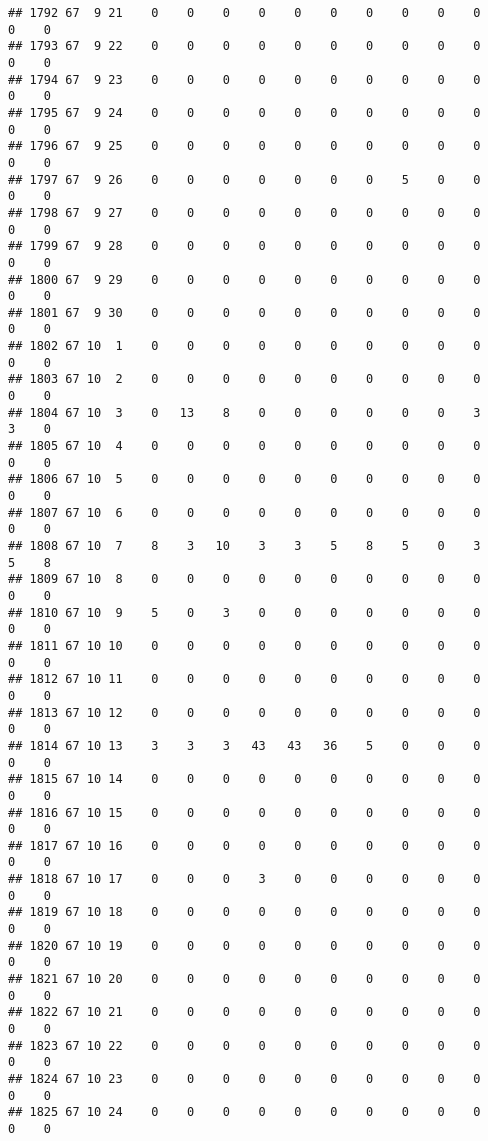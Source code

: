 \documentclass[]{article}
\begin{document}
\begin{verbatim}
## 1792 67  9 21    0    0    0    0    0    0    0    0    0    0    0    0
## 1793 67  9 22    0    0    0    0    0    0    0    0    0    0    0    0
## 1794 67  9 23    0    0    0    0    0    0    0    0    0    0    0    0
## 1795 67  9 24    0    0    0    0    0    0    0    0    0    0    0    0
## 1796 67  9 25    0    0    0    0    0    0    0    0    0    0    0    0
## 1797 67  9 26    0    0    0    0    0    0    0    5    0    0    0    0
## 1798 67  9 27    0    0    0    0    0    0    0    0    0    0    0    0
## 1799 67  9 28    0    0    0    0    0    0    0    0    0    0    0    0
## 1800 67  9 29    0    0    0    0    0    0    0    0    0    0    0    0
## 1801 67  9 30    0    0    0    0    0    0    0    0    0    0    0    0
## 1802 67 10  1    0    0    0    0    0    0    0    0    0    0    0    0
## 1803 67 10  2    0    0    0    0    0    0    0    0    0    0    0    0
## 1804 67 10  3    0   13    8    0    0    0    0    0    0    3    3    0
## 1805 67 10  4    0    0    0    0    0    0    0    0    0    0    0    0
## 1806 67 10  5    0    0    0    0    0    0    0    0    0    0    0    0
## 1807 67 10  6    0    0    0    0    0    0    0    0    0    0    0    0
## 1808 67 10  7    8    3   10    3    3    5    8    5    0    3    5    8
## 1809 67 10  8    0    0    0    0    0    0    0    0    0    0    0    0
## 1810 67 10  9    5    0    3    0    0    0    0    0    0    0    0    0
## 1811 67 10 10    0    0    0    0    0    0    0    0    0    0    0    0
## 1812 67 10 11    0    0    0    0    0    0    0    0    0    0    0    0
## 1813 67 10 12    0    0    0    0    0    0    0    0    0    0    0    0
## 1814 67 10 13    3    3    3   43   43   36    5    0    0    0    0    0
## 1815 67 10 14    0    0    0    0    0    0    0    0    0    0    0    0
## 1816 67 10 15    0    0    0    0    0    0    0    0    0    0    0    0
## 1817 67 10 16    0    0    0    0    0    0    0    0    0    0    0    0
## 1818 67 10 17    0    0    0    3    0    0    0    0    0    0    0    0
## 1819 67 10 18    0    0    0    0    0    0    0    0    0    0    0    0
## 1820 67 10 19    0    0    0    0    0    0    0    0    0    0    0    0
## 1821 67 10 20    0    0    0    0    0    0    0    0    0    0    0    0
## 1822 67 10 21    0    0    0    0    0    0    0    0    0    0    0    0
## 1823 67 10 22    0    0    0    0    0    0    0    0    0    0    0    0
## 1824 67 10 23    0    0    0    0    0    0    0    0    0    0    0    0
## 1825 67 10 24    0    0    0    0    0    0    0    0    0    0    0    0

\end{verbatim}
\end{document}
